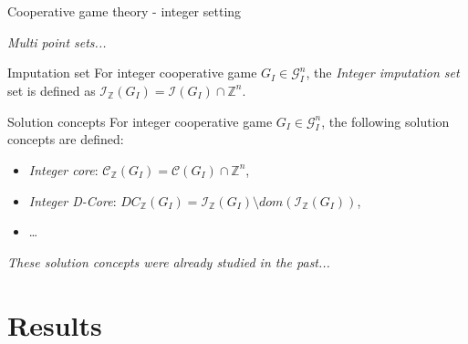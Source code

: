\documentclass{beamer}
\newcommand{\Z}{\mathbb{Z}}
\begin{document}


\begin{frame}{Cooperative game theory - integer setting}

    \pause

    \textit{Multi point sets...}

    \pause

    \begin{block}{Imputation set}
        For integer cooperative game $G_I \in \mathcal{G}_I^n$, the \emph{Integer imputation set} set is defined as $\mathcal{I}_{\Z}(G_I) = \mathcal{I}(G_I) \cap \Z^{n}$.
    \end{block}

    \pause

    \begin{block}{Solution concepts}
        For integer cooperative game $G_I \in \mathcal{G}_I^n$, the following solution concepts are defined:
        \begin{itemize}
            \item \emph{Integer core}: $\mathcal{C}_{\Z}(G_I) = \mathcal{C}(G_I) \cap \Z^{n}$,
            \item \emph{Integer D-Core}: $DC_{\Z}(G_I) = \mathcal{I}_{\Z}(G_I) \setminus dom(\mathcal{I}_{\Z}(G_I))$,
            \item \dots
        \end{itemize}
    \end{block}

    \pause

    \textit{These solution concepts were already studied in the past...}
\end{frame}




\section{Results}

\end{document}
